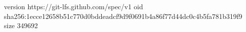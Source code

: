 version https://git-lfs.github.com/spec/v1
oid sha256:1ecce12658b51c770d0bddeadcf9d9f0691b4a86f77d44dc0c4b5fa781b319f9
size 349692
